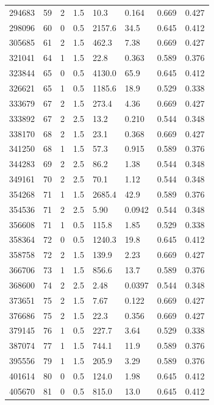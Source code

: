 \documentclass[preview]{standalone}
\begin{document}
{{{\begin{tabular}{L{1.2cm}C{1.2cm} C{0.3cm}C{0.5cm} C{1.4cm}C{1.4cm} C{1.4cm}C{1.4cm}}
  294683  &    59  & 2     & 1.5 &  10.3  & 0.164  & 0.669 &  0.427   \\ 
  298096  &    60  & 0     & 0.5 &  2157.6  & 34.5  & 0.645 &  0.412   \\ 
  305685  &    61  & 2     & 1.5 &  462.3  & 7.38  & 0.669 &  0.427   \\ 
  321041  &    64  & 1     & 1.5 &  22.8  & 0.363  & 0.589 &  0.376   \\ 
  323844  &    65  & 0     & 0.5 &  4130.0  & 65.9  & 0.645 &  0.412   \\ 
  326621  &    65  & 1     & 0.5 &  1185.6  & 18.9  & 0.529 &  0.338   \\ 
  333679  &    67  & 2     & 1.5 &  273.4  & 4.36  & 0.669 &  0.427   \\ 
  333892  &    67  & 2     & 2.5 &  13.2  & 0.210  & 0.544 &  0.348   \\ 
  338170  &    68  & 2     & 1.5 &  23.1  & 0.368  & 0.669 &  0.427   \\ 
  341250  &    68  & 1     & 1.5 &  57.3  & 0.915  & 0.589 &  0.376   \\ 
  344283  &    69  & 2     & 2.5 &  86.2  & 1.38  & 0.544 &  0.348   \\ 
  349161  &    70  & 2     & 2.5 &  70.1  & 1.12  & 0.544 &  0.348   \\ 
  354268  &    71  & 1     & 1.5 &  2685.4  & 42.9  & 0.589 &  0.376   \\ 
  354536  &    71  & 2     & 2.5 &  5.90  & 0.0942  & 0.544 &  0.348   \\ 
  356608  &    71  & 1     & 0.5 &  115.8  & 1.85  & 0.529 &  0.338   \\ 
  358364  &    72  & 0     & 0.5 &  1240.3  & 19.8  & 0.645 &  0.412   \\ 
  358758  &    72  & 2     & 1.5 &  139.9  & 2.23  & 0.669 &  0.427   \\ 
  366706  &    73  & 1     & 1.5 &  856.6  & 13.7  & 0.589 &  0.376   \\ 
  368600  &    74  & 2     & 2.5 &  2.48  & 0.0397  & 0.544 &  0.348   \\ 
  373651  &    75  & 2     & 1.5 &  7.67  & 0.122  & 0.669 &  0.427   \\ 
  376686  &    75  & 2     & 1.5 &  22.3  & 0.356  & 0.669 &  0.427   \\ 
  379145  &    76  & 1     & 0.5 &  227.7  & 3.64  & 0.529 &  0.338   \\ 
  387074  &    77  & 1     & 1.5 &  744.1  & 11.9  & 0.589 &  0.376   \\ 
  395556  &    79  & 1     & 1.5 &  205.9  & 3.29  & 0.589 &  0.376   \\ 
  401614  &    80  & 0     & 0.5 &  124.0  & 1.98  & 0.645 &  0.412   \\ 
  405670  &    81  & 0     & 0.5 &  815.0  & 13.0  & 0.645 &  0.412   \\ 
\hline 
\end{tabular} 

}}}
\end{document}

